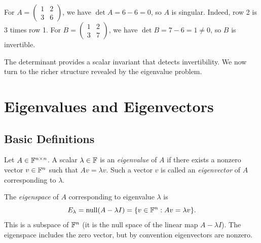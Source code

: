 \documentclass[11pt,a4paper]{article}
\begin{document}
\begin{example}
\label{ex:invertibility}
For $A = \begin{pmatrix} 1 & 2 \\ 3 & 6 \end{pmatrix}$, we have
$\det A = 6 - 6 = 0$, so $A$ is singular.  Indeed, row 2 is 3 times row 1.
For $B = \begin{pmatrix} 1 & 2 \\ 3 & 7 \end{pmatrix}$, we have
$\det B = 7 - 6 = 1 \neq 0$, so $B$ is invertible.
\end{example}

The determinant provides a scalar invariant that detects invertibility.
We now turn to the richer structure revealed by the eigenvalue problem.

\section{Eigenvalues and Eigenvectors}
\label{sec:eigenvalues}

\subsection{Basic Definitions}

\begin{definition}
\label{def:eigenvalue}
Let $A \in \mathbb{F}^{n \times n}$.  A scalar $\lambda \in \mathbb{F}$ is an
\emph{eigenvalue} of $A$ if there exists a nonzero vector $v \in \mathbb{F}^n$
such that $Av = \lambda v$.  Such a vector $v$ is called an
\emph{eigenvector} of $A$ corresponding to $\lambda$.
\end{definition}

\begin{definition}[Eigenspace]
\label{def:eigenspace}
The \emph{eigenspace} of $A$ corresponding to eigenvalue $\lambda$ is
\[
  E_\lambda = \operatorname{null}(A - \lambda I) = \{v \in \mathbb{F}^n : Av = \lambda v\}.
\]
This is a subspace of $\mathbb{F}^n$ (it is the null space of the linear map
$A - \lambda I$).  The eigenspace includes the zero vector, but by
convention eigenvectors are nonzero.
\end{definition}
\end{document}
